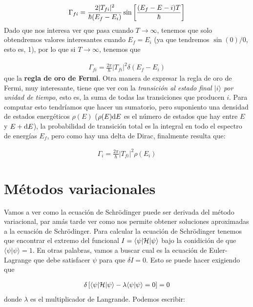 \begin{eqnarray}
	\Gamma_{fi} = \frac{2 |T_{fi}|^2}{\hbar(E_f-E_i)} \sin \left[ \frac{(E_f-E-i)T}{\hbar} \right]
\end{eqnarray}
Dado que nos interesa ver que pasa cuando $T\rightarrow \infty$, tenemos que solo obtendremos valores interesantes cuando $E_f=E_i$ (ya que tendremos $ \sin(0)/0$, esto es, 1), por lo que si $T\rightarrow \infty$, tenemos que

\begin{eqnarray}
	\Gamma_{fi} = \frac{2\pi}{\hbar} |T_{fi}|^2 \delta (E_f -E_i)
\end{eqnarray}
que la \textbf{regla de oro de Fermi}. Otra manera de expresar la regla de oro de Fermi, muy interesante, tiene que ver con la \textit{transición al estado final $|i\rangle$ por unidad de tiempo}, esto es, la suma de todas las transiciones que producen $i$. Para computar esto tendríamos que hacer un sumatorio, pero suponiento una densidad de estados energéticos $\rho(E)$ ($\rho(E)\mathrm{d} E$ es el número de estados que hay entre $E$ y $E+\mathrm{d} E$), la probabilidad de transición total es la integral en todo el espectro de energías $E_f$, pero como hay una delta de Dirac, finalmente resulta que:

\begin{eqnarray}
	\Gamma_i = \frac{2\pi}{\hbar} |T_{fi}|^2 \rho (E_i)
\end{eqnarray}


\section{Métodos variacionales}

Vamos a ver como la ecuación de Schrödinger puede ser derivada del método variacional, par amás tarde ver como nos permite obtener soluciones aproximadas a la ecuación de Schrödinger. Para calcular la ecuación de Schrödinger tenemos que encontrar el extremo del funcional $I=\langle \psi |\mathcal{H}|\psi\rangle $ bajo la conidición de que $\langle \psi | \psi \rangle= 1$. En otras palabras, vamos a buscar cual es la ecuación de Euler-Lagrange que debe satisfacer $\psi$ para que $\delta I = 0$. Esto se puede hacer exigiendo que

\begin{eqnarray}
	\delta \left[ \langle \psi | \mathcal{H} |\psi \rangle - \lambda \langle \psi |\psi \rangle = 0 \right] = 0
\end{eqnarray} 
donde $\lambda$ es el multiplicador de Langrande. Podemos escribir:

